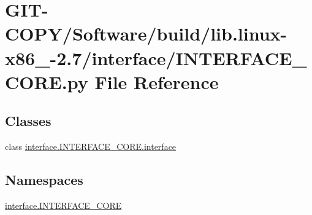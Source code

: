 \hypertarget{GIT-COPY_2Software_2build_2lib_8linux-x86__64-2_87_2interface_2INTERFACE__CORE_8py}{}\section{G\+I\+T-\/\+C\+O\+P\+Y/\+Software/build/lib.linux-\/x86\+\_-\/2.7/interface/\+I\+N\+T\+E\+R\+F\+A\+C\+E\+\_\+\+C\+O\+R\+E.py File Reference}
\label{GIT-COPY_2Software_2build_2lib_8linux-x86__64-2_87_2interface_2INTERFACE__CORE_8py}
\subsection*{Classes}
\begin{DoxyCompactItemize}
\item 
class \hyperlink{classinterface_1_1INTERFACE__CORE_1_1interface}{interface.\+I\+N\+T\+E\+R\+F\+A\+C\+E\+\_\+\+C\+O\+R\+E.\+interface}
\end{DoxyCompactItemize}
\subsection*{Namespaces}
\begin{DoxyCompactItemize}
\item 
 \hyperlink{namespaceinterface_1_1INTERFACE__CORE}{interface.\+I\+N\+T\+E\+R\+F\+A\+C\+E\+\_\+\+C\+O\+R\+E}
\end{DoxyCompactItemize}
